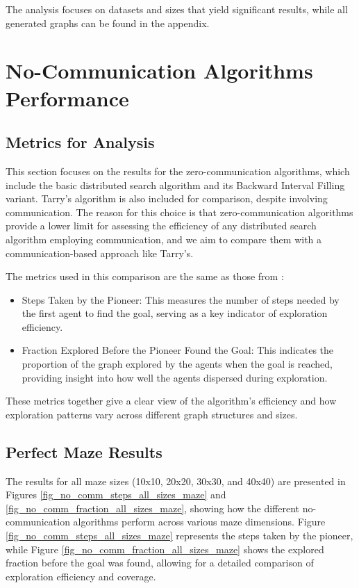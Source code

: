 The analysis focuses on datasets and sizes that yield significant results, while all generated graphs can be found in the appendix.


\section{No-Communication Algorithms Performance}
\label{section_result_no_comm}

\subsection{Metrics for Analysis}
\label{subsection_no_comm_metrics}

This section focuses on the results for the zero-communication algorithms, which include the basic distributed search algorithm and its Backward Interval Filling variant. Tarry's algorithm is also included for comparison, despite involving communication. The reason for this choice is that zero-communication algorithms provide a lower limit for assessing the efficiency of any distributed search algorithm employing communication, and we aim to compare them with a communication-based approach like Tarry's.


The metrics used in this comparison are the same as those from :

\begin{itemize}
    \item Steps Taken by the Pioneer: This measures the number of steps needed by the first agent to find the goal, serving as a key indicator of exploration efficiency.
    \item Fraction Explored Before the Pioneer Found the Goal: This indicates the proportion of the graph explored by the agents when the goal is reached, providing insight into how well the agents dispersed during exploration.
\end{itemize}
    
These metrics together give a clear view of the algorithm's efficiency and how exploration patterns vary across different graph structures and sizes.

\subsection{Perfect Maze Results} 
\label{subsection_no_comm_maze_results}


The results for all maze sizes (10x10, 20x20, 30x30, and 40x40) are presented in Figures \ref{fig_no_comm_steps_all_sizes_maze} and \ref{fig_no_comm_fraction_all_sizes_maze}, showing how the different no-communication algorithms perform across various maze dimensions. Figure \ref{fig_no_comm_steps_all_sizes_maze} represents the steps taken by the pioneer, while Figure \ref{fig_no_comm_fraction_all_sizes_maze} shows the explored fraction before the goal was found, allowing for a detailed comparison of exploration efficiency and coverage.

